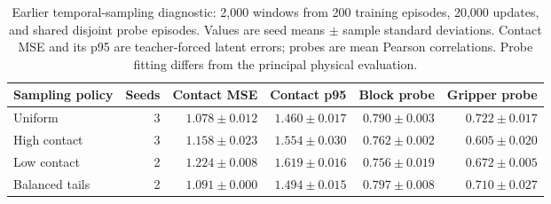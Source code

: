 \begin{table}[t]
\centering
\caption{Earlier temporal-sampling diagnostic: 2,000 windows from 200 training episodes, 20,000 updates, and shared disjoint probe episodes. Values are seed means $\pm$ sample standard deviations. Contact MSE and its p95 are teacher-forced latent errors; probes are mean Pearson correlations. Probe fitting differs from the principal physical evaluation.}
\label{tab:sampling}
\footnotesize
\setlength{\tabcolsep}{5pt}
\renewcommand{\arraystretch}{1.12}
\begin{tabular}{lrrrrr}
\toprule
Sampling policy & Seeds & Contact MSE & Contact p95 & Block probe & Gripper probe \\
\midrule
Uniform & 3 & $1.078\pm0.012$ & $1.460\pm0.017$ & $0.790\pm0.003$ & $0.722\pm0.017$ \\
High contact & 3 & $1.158\pm0.023$ & $1.554\pm0.030$ & $0.762\pm0.002$ & $0.605\pm0.020$ \\
Low contact & 2 & $1.224\pm0.008$ & $1.619\pm0.016$ & $0.756\pm0.019$ & $0.672\pm0.005$ \\
Balanced tails & 2 & $1.091\pm0.000$ & $1.494\pm0.015$ & $0.797\pm0.008$ & $0.710\pm0.027$ \\
\bottomrule
\end{tabular}
\end{table}
